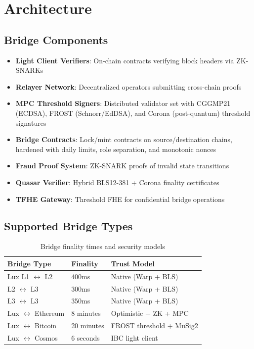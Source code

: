 \section{Architecture}


\subsection{Bridge Components}

\begin{itemize}[leftmargin=1.1em]
  \item \textbf{Light Client Verifiers}: On-chain contracts verifying block headers via ZK-SNARKs
  \item \textbf{Relayer Network}: Decentralized operators submitting cross-chain proofs
  \item \textbf{MPC Threshold Signers}: Distributed validator set with CGGMP21 (ECDSA), FROST (Schnorr/EdDSA), and Corona (post-quantum) threshold signatures
  \item \textbf{Bridge Contracts}: Lock/mint contracts on source/destination chains, hardened with daily limits, role separation, and monotonic nonces
  \item \textbf{Fraud Proof System}: ZK-SNARK proofs of invalid state transitions
  \item \textbf{Quasar Verifier}: Hybrid BLS12-381 + Corona finality certificates
  \item \textbf{TFHE Gateway}: Threshold FHE for confidential bridge operations
\end{itemize}

\subsection{Supported Bridge Types}

\begin{table}[h]
\centering
\begin{tabular}{lll}
\toprule
Bridge Type & Finality & Trust Model \\
\midrule
Lux L1 $\leftrightarrow$ L2 & 400ms & Native (Warp + BLS) \\
L2 $\leftrightarrow$ L3 & 300ms & Native (Warp + BLS) \\
L3 $\leftrightarrow$ L3 & 350ms & Native (Warp + BLS) \\
Lux $\leftrightarrow$ Ethereum & 8 minutes & Optimistic + ZK + MPC \\
Lux $\leftrightarrow$ Bitcoin & 20 minutes & FROST threshold + MuSig2 \\
Lux $\leftrightarrow$ Cosmos & 6 seconds & IBC light client \\
\bottomrule
\end{tabular}
\caption{Bridge finality times and security models}
\end{table}

